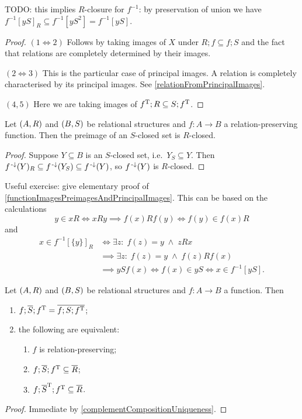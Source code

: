 TODO: this implies $R$-closure for $f^{-1}$: by preservation of union we have $f^{-1}[yS]_R \subseteq f^{-1}[yS^2] = f^{-1}[yS]$.
\begin{proof}
$(1 \Leftrightarrow 2)$ Follows by taking images of $X$ under $R;f \subseteq f;S$ and the fact that relations are completely determined by their images.

$(2 \Leftrightarrow 3)$ This is the particular case of principal images. A relation is completely characterised by its principal images. See \ref{relationFromPrincipalImages}.

$(4, 5)$ Here we are taking images of $f^{\mathrm{T}};R \subseteq S;f^{\mathrm{T}}$.
\end{proof}
\begin{lemma} \label{closurePreimageRelationPreservingFunctions}
Let $\sSet{A,R}$ and $\sSet{B, S}$ be relational structures and $f: A\to B$ a relation-preserving function. Then the preimage of an $S$-closed set is $R$-closed.
\end{lemma}
\begin{proof}
Suppose $Y\subseteq B$ is an $S$-closed set, i.e.\ $Y_S\subseteq Y$. Then $f^{\text{\hspace{0.15em}-}\downarrow}(Y)_R \subseteq f^{\text{\hspace{0.15em}-}\downarrow}(Y_S)\subseteq f^{\text{\hspace{0.15em}-}\downarrow}(Y)$, so $f^{\text{\hspace{0.15em}-}\downarrow}(Y)$ is $R$-closed.
\end{proof}

\begin{note}
Useful exercise: give elementary proof of \ref{functionImagesPreimagesAndPrincipalImages}. This can be based on the calculations
\[ y\in xR \iff xRy \implies f(x)Rf(y) \iff f(y) \in f(x)R \]
and
\begin{align*}
x\in f^{-1}[\{y\}]_R &\iff \exists z:\; f(z) = y \;\land\; zRx \\
&\implies \exists z:\; f(z) = y \;\land\; f(z)Rf(x) \\
&\implies ySf(x) \iff f(x) \in yS \iff x\in f^{-1}[yS].
\end{align*}
\end{note}

\begin{lemma} \label{relationPreservingComplement}
Let $\sSet{A,R}$ and $\sSet{B, S}$ be relational structures and $f: A\to B$ a function. Then
\begin{enumerate}
\item $f;\overline{S};f^{\mathrm{T}} = \overline{f;S;f^{\mathrm{T}}}$;
\item the following are equivalent:
\begin{enumerate}
\item $f$ is relation-preserving;
\item $f;\overline{S};f^{\mathrm{T}} \subseteq \overline{R}$;
\item $f;\overline{S}^{\mathrm{T}};f^{\mathrm{T}} \subseteq \overline{R}$.
\end{enumerate}
\end{enumerate}
\end{lemma}
\begin{proof}
Immediate by \ref{complementCompositionUniqueness}.
\end{proof}

